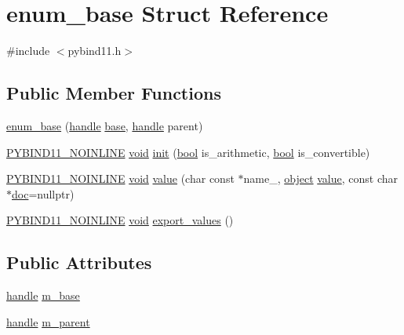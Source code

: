 \hypertarget{structenum__base}{}\section{enum\+\_\+base Struct Reference}
\label{structenum__base}


{\ttfamily \#include $<$pybind11.\+h$>$}

\subsection*{Public Member Functions}
\begin{DoxyCompactItemize}
\item 
\mbox{\hyperlink{structenum__base_a4798327fe83475e6f117dc5d03709d70}{enum\+\_\+base}} (\mbox{\hyperlink{classhandle}{handle}} \mbox{\hyperlink{structbase}{base}}, \mbox{\hyperlink{classhandle}{handle}} parent)
\item 
\mbox{\hyperlink{detail_2common_8h_a1fb186b7494d5c576d902c0730ecbb71}{P\+Y\+B\+I\+N\+D11\+\_\+\+N\+O\+I\+N\+L\+I\+NE}} \mbox{\hyperlink{_s_d_l__opengles2__gl2ext_8h_ae5d8fa23ad07c48bb609509eae494c95}{void}} \mbox{\hyperlink{structenum__base_a0c6afbca40877b86be3840947b39596c}{init}} (\mbox{\hyperlink{asdl_8h_af6a258d8f3ee5206d682d799316314b1}{bool}} is\+\_\+arithmetic, \mbox{\hyperlink{asdl_8h_af6a258d8f3ee5206d682d799316314b1}{bool}} is\+\_\+convertible)
\item 
\mbox{\hyperlink{detail_2common_8h_a1fb186b7494d5c576d902c0730ecbb71}{P\+Y\+B\+I\+N\+D11\+\_\+\+N\+O\+I\+N\+L\+I\+NE}} \mbox{\hyperlink{_s_d_l__opengles2__gl2ext_8h_ae5d8fa23ad07c48bb609509eae494c95}{void}} \mbox{\hyperlink{structenum__base_a93a70f7b4e3397302a97d42f7d941793}{value}} (char const $\ast$name\+\_\+, \mbox{\hyperlink{classobject}{object}} \mbox{\hyperlink{_s_d_l__opengl__glext_8h_a8ad81492d410ff2ac11f754f4042150f}{value}}, const char $\ast$\mbox{\hyperlink{structdoc}{doc}}=nullptr)
\item 
\mbox{\hyperlink{detail_2common_8h_a1fb186b7494d5c576d902c0730ecbb71}{P\+Y\+B\+I\+N\+D11\+\_\+\+N\+O\+I\+N\+L\+I\+NE}} \mbox{\hyperlink{_s_d_l__opengles2__gl2ext_8h_ae5d8fa23ad07c48bb609509eae494c95}{void}} \mbox{\hyperlink{structenum__base_aceb25051fa6f046399a3c6c1c43f1b27}{export\+\_\+values}} ()
\end{DoxyCompactItemize}
\subsection*{Public Attributes}
\begin{DoxyCompactItemize}
\item 
\mbox{\hyperlink{classhandle}{handle}} \mbox{\hyperlink{structenum__base_a11a00d03ae8a8f8e302a63f9cee5e5c3}{m\+\_\+base}}
\item 
\mbox{\hyperlink{classhandle}{handle}} \mbox{\hyperlink{structenum__base_ac56daf79223e3ac3068558b19a56ede9}{m\+\_\+parent}}
\end{DoxyCompactItemize}


